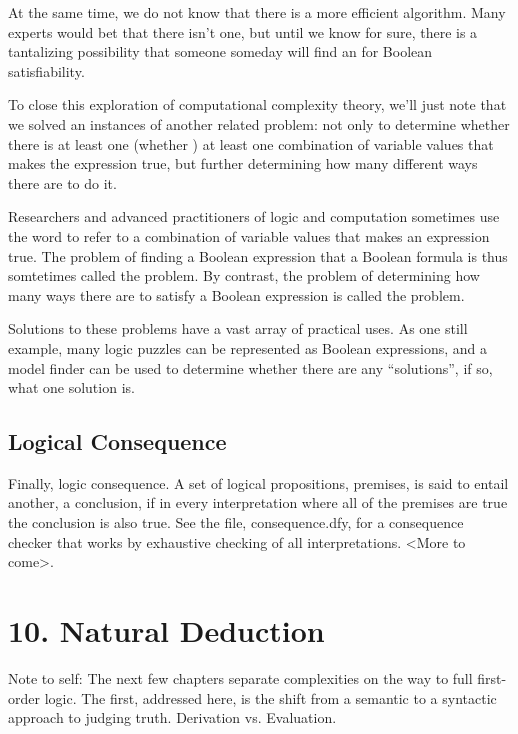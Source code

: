 \documentclass[letterpaper,10pt,english]{sphinxmanual}
\begin{document}
At the same time, we do not know that there is  a more efficient
algorithm. Many experts would bet that there isn’t one, but until we
know for sure, there is a tantalizing possibility that someone someday
will find an  for Boolean satisfiability.

To close this exploration of computational complexity theory, we’ll
just note that we solved an instances of another related problem: not
only to determine whether there is at least one (whether ) at least one combination of variable values that makes the
expression true, but further determining how many different ways there
are to do it.

Researchers and advanced practitioners of logic and computation
sometimes use the word  to refer to a combination of variable
values that makes an expression true. The problem of finding a Boolean
expression that  a Boolean formula is thus somtetimes
called the  problem. By contrast, the problem of
determining how many ways there are to satisfy a Boolean expression is
called the  problem.

Solutions to these problems have a vast array of practical uses.  As
one still example, many logic puzzles can be represented as Boolean
expressions, and a model finder can be used to determine whether there
are any “solutions”, if so, what one solution is.


\section{Logical Consequence}
\label{\detokenize{09-propositional-logic:logical-consequence}}
Finally, logic consequence. A set of logical propositions, premises,
is said to entail another, a conclusion, if in every interpretation
where all of the premises are true the conclusion is also true. See
the file, consequence.dfy, for a consequence checker that works by
exhaustive checking of all interpretations. \textless{}More to come\textgreater{}.


\chapter{10. Natural Deduction}
\label{\detokenize{10-natural-deduction:natural-deduction}}\label{\detokenize{10-natural-deduction::doc}}
Note to self: The next few chapters separate complexities on the way
to full first-order logic. The first, addressed here, is the shift
from a semantic to a syntactic approach to judging truth. Derivation
vs. Evaluation.
\end{document}
